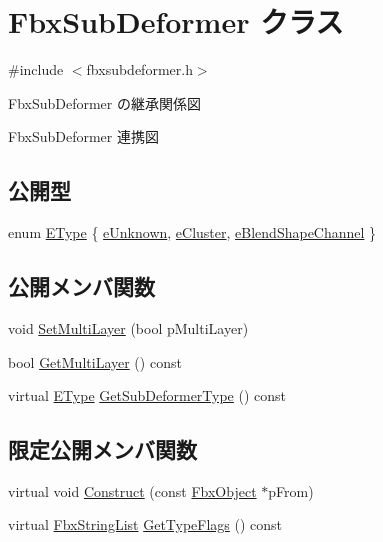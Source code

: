 \hypertarget{class_fbx_sub_deformer}{}\section{Fbx\+Sub\+Deformer クラス}
\label{class_fbx_sub_deformer}


{\ttfamily \#include $<$fbxsubdeformer.\+h$>$}



Fbx\+Sub\+Deformer の継承関係図


Fbx\+Sub\+Deformer 連携図
\subsection*{公開型}
\begin{DoxyCompactItemize}
\item 
enum \hyperlink{class_fbx_sub_deformer_aed7eba8aabbb8b25a8ddbab127d67319}{E\+Type} \{ \hyperlink{class_fbx_sub_deformer_aed7eba8aabbb8b25a8ddbab127d67319a688c70619ed57e89246838f7b89640cf}{e\+Unknown}, 
\hyperlink{class_fbx_sub_deformer_aed7eba8aabbb8b25a8ddbab127d67319a329357c41a658df236d0802d586c2643}{e\+Cluster}, 
\hyperlink{class_fbx_sub_deformer_aed7eba8aabbb8b25a8ddbab127d67319a1082bcdf5d88e593ea78a8da89b5cebd}{e\+Blend\+Shape\+Channel}
 \}
\end{DoxyCompactItemize}
\subsection*{公開メンバ関数}
\begin{DoxyCompactItemize}
\item 
void \hyperlink{class_fbx_sub_deformer_a46748fbb4e8496449bb28e6eeefde288}{Set\+Multi\+Layer} (bool p\+Multi\+Layer)
\item 
bool \hyperlink{class_fbx_sub_deformer_a9a430ccafe4f08c976b9963627b5de05}{Get\+Multi\+Layer} () const
\item 
virtual \hyperlink{class_fbx_sub_deformer_aed7eba8aabbb8b25a8ddbab127d67319}{E\+Type} \hyperlink{class_fbx_sub_deformer_a1a1998b98ca03598bc6bec630e1aaa97}{Get\+Sub\+Deformer\+Type} () const
\end{DoxyCompactItemize}
\subsection*{限定公開メンバ関数}
\begin{DoxyCompactItemize}
\item 
virtual void \hyperlink{class_fbx_sub_deformer_ae3d566383651e82b681827f0f38b97f3}{Construct} (const \hyperlink{class_fbx_object}{Fbx\+Object} $\ast$p\+From)
\item 
virtual \hyperlink{class_fbx_string_list}{Fbx\+String\+List} \hyperlink{class_fbx_sub_deformer_a80652fd0521b2ea1897e221e5ae1b5cf}{Get\+Type\+Flags} () const
\end{DoxyCompactItemize}
